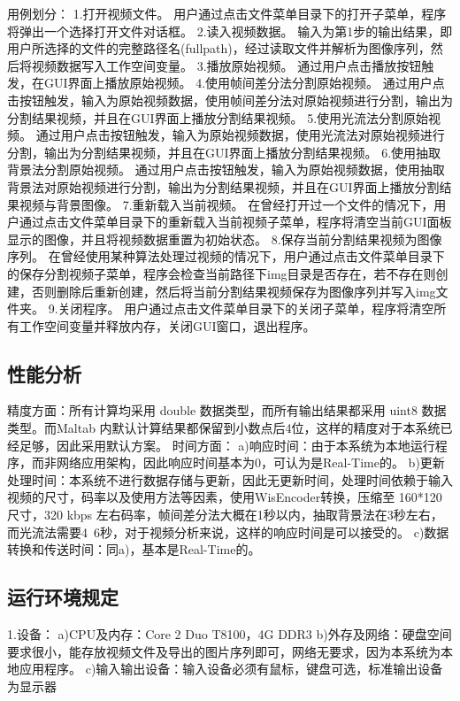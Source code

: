 \documentclass[18pt, twoside, a4paper, dvipdfm]{book}
\begin{document}
用例划分：
1.打开视频文件。
用户通过点击文件菜单目录下的打开子菜单，程序将弹出一个选择打开文件对话框。
2.读入视频数据。
输入为第1步的输出结果，即用户所选择的文件的完整路径名(fullpath)，经过读取文件并解析为图像序列，然后将视频数据写入工作空间变量。
3.播放原始视频。
通过用户点击播放按钮触发，在GUI界面上播放原始视频。
4.使用帧间差分法分割原始视频。
通过用户点击按钮触发，输入为原始视频数据，使用帧间差分法对原始视频进行分割，输出为分割结果视频，并且在GUI界面上播放分割结果视频。
5.使用光流法分割原始视频。
通过用户点击按钮触发，输入为原始视频数据，使用光流法对原始视频进行分割，输出为分割结果视频，并且在GUI界面上播放分割结果视频。
6.使用抽取背景法分割原始视频。
通过用户点击按钮触发，输入为原始视频数据，使用抽取背景法对原始视频进行分割，输出为分割结果视频，并且在GUI界面上播放分割结果视频与背景图像。
7.重新载入当前视频。
在曾经打开过一个文件的情况下，用户通过点击文件菜单目录下的重新载入当前视频子菜单，程序将清空当前GUI面板显示的图像，并且将视频数据重置为初始状态。
8.保存当前分割结果视频为图像序列。
在曾经使用某种算法处理过视频的情况下，用户通过点击文件菜单目录下的保存分割视频子菜单，程序会检查当前路径下img目录是否存在，若不存在则创建，否则删除后重新创建，然后将当前分割结果视频保存为图像序列并写入img文件夹。
9.关闭程序。
用户通过点击文件菜单目录下的关闭子菜单，程序将清空所有工作空间变量并释放内存，关闭GUI窗口，退出程序。

\subsection{性能分析}

精度方面：所有计算均采用 double 数据类型，而所有输出结果都采用 uint8 数据类型。而Maltab 内默认计算结果都保留到小数点后4位，这样的精度对于本系统已经足够，因此采用默认方案。 
时间方面：
a)响应时间：由于本系统为本地运行程序，而非网络应用架构，因此响应时间基本为0，可认为是Real-Time的。
b)更新处理时间：本系统不进行数据存储与更新，因此无更新时间，处理时间依赖于输入视频的尺寸，码率以及使用方法等因素，使用WisEncoder转换，压缩至 160*120尺寸，320 kbps 左右码率，帧间差分法大概在1秒以内，抽取背景法在3秒左右，而光流法需要4~6秒，对于视频分析来说，这样的响应时间是可以接受的。
c)数据转换和传送时间：同a)，基本是Real-Time的。

\subsection{运行环境规定}

	1.设备：
a)CPU及内存：Core 2 Duo T8100，4G DDR3
b)外存及网络：硬盘空间要求很小，能存放视频文件及导出的图片序列即可，网络无要求，因为本系统为本地应用程序。
c)输入输出设备：输入设备必须有鼠标，键盘可选，标准输出设备为显示器
\end{document}

